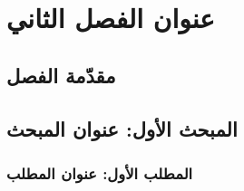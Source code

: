 
\chapter{عنوان الفصل الثاني}
\section*{مقدّمة الفصل}


\section{المبحث الأول: عنوان المبحث}
\subsection{المطلب الأول: عنوان المطلب}

